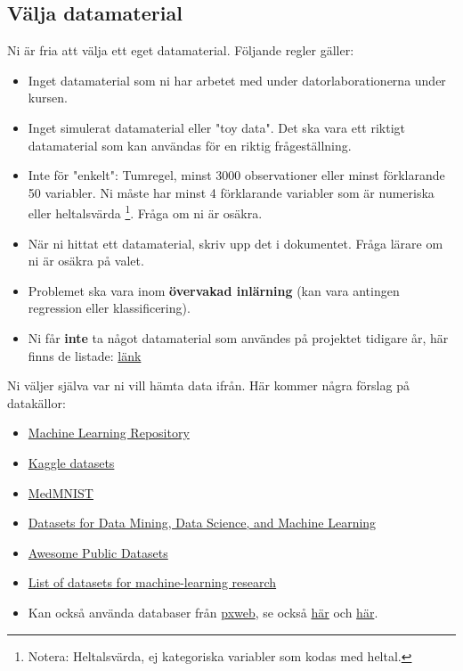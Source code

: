 \documentclass[a4paper]{article}
\begin{document}
\subsection*{Välja datamaterial}
Ni är fria att välja ett eget datamaterial. Följande regler gäller:
\begin{itemize}
    \item Inget datamaterial som ni har arbetet med under datorlaborationerna under kursen.
    \item Inget simulerat datamaterial eller "toy data". Det ska vara ett riktigt datamaterial som kan användas för en riktig frågeställning.
    \item Inte för "enkelt": Tumregel, minst 3000 observationer eller minst förklarande 50 variabler. Ni måste har minst 4 förklarande variabler som är numeriska eller heltalsvärda
    \footnote{Notera: Heltalsvärda, ej kategoriska variabler som kodas med heltal.}. Fråga om ni är osäkra.
    \item När ni hittat ett datamaterial, skriv upp det i dokumentet. Fråga lärare om ni är osäkra på valet.
    \item Problemet ska vara inom \textbf{övervakad inlärning} (kan vara antingen regression eller klassificering).
    \item Ni får \textbf{inte} ta något datamaterial som användes på projektet tidigare år, här finns de listade: \href{https://liuonline.sharepoint.com/:f:/r/sites/Lisam_732G57_2026HT_6E/CourseDocuments/projekt%20-%20datamaterial%20fr%C3%A5n%20tidigare%20%C3%A5r?d=w8b404f3e3d154c7bb8f6dcf4c7fe0ca1&csf=1&web=1&e=ZAVZuT}{länk}
\end{itemize}
Ni väljer själva var ni vill hämta data ifrån. Här kommer några förslag på datakällor:
\begin{itemize}
    \item \href{https://archive.ics.uci.edu/ml/index.php}{Machine Learning Repository}
    \item \href{https://www.kaggle.com/datasets}{Kaggle datasets}
    \item \href{https://medmnist.com/}{MedMNIST}
    \item \href{https://www.kdnuggets.com/datasets/index.html}{Datasets for Data Mining, Data Science, and Machine Learning}
    \item \href{https://github.com/awesomedata/awesome-public-datasets}{Awesome Public Datasets}
    \item \href{https://en.wikipedia.org/wiki/List_of_datasets_for_machine-learning_research}{List of datasets for machine-learning research}
    \item Kan också använda databaser från \href{https://cran.r-project.org/web/packages/pxweb/index.html}{pxweb}, se också \href{https://cran.r-project.org/web/packages/pxweb/vignettes/pxweb.html}{här} och \href{https://www.scb.se/en/services/statistical-programs-for-px-files/px-web/pxweb-examples/}{här}.
\end{itemize}
\end{document}
